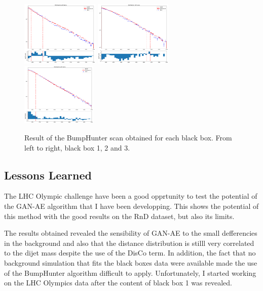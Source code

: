 \documentclass[letterpaper,11pt]{article}
\begin{document}
\begin{figure}[h!]
\centering
\includegraphics[width=0.33\textwidth]{img/bump_BB1.pdf}
\includegraphics[width=0.33\textwidth]{img/bump_BB2.pdf}
\includegraphics[width=0.32\textwidth]{img/bump_BB3.pdf}
\caption{Result of the BumpHunter scan obtained for each black box.  From left to right, black box 1, 2 and 3.}
\label{fig:GAE_BB_BH}
\end{figure}

\subsection{Lessons Learned}
\label{sec:lessons}

\noindent The LHC Olympic challenge have been a good opprtunity to test the potential of the GAN-AE algorithm that I have been developping.
This shows the potential of this method with the good results on the RnD dataset, but also its limits.  

\noindent The results obtained revealed the sensibility of GAN-AE to the small defferencies in the background and also that the distance distribution is stilll very correlated to the dijet mass despite the use of the DisCo term. 
In addition, the fact that no background simulation that fits the black boxes data were available made the use of the BumpHunter algorithm difficult to apply.  
Unfortunately, I started working on the LHC Olympics data after the content of black box 1 was revealed.
\end{document}

